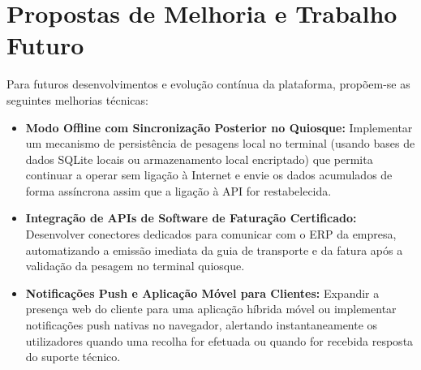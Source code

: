 \section{Propostas de Melhoria e Trabalho Futuro}

Para futuros desenvolvimentos e evolução contínua da plataforma, propõem-se as seguintes melhorias técnicas:
\begin{itemize}
    \item \textbf{Modo Offline com Sincronização Posterior no Quiosque:} Implementar um mecanismo de persistência de pesagens local no terminal (usando bases de dados SQLite locais ou armazenamento local encriptado) que permita continuar a operar sem ligação à Internet e envie os dados acumulados de forma assíncrona assim que a ligação à API for restabelecida.
    \item \textbf{Integração de APIs de Software de Faturação Certificado:} Desenvolver conectores dedicados para comunicar com o ERP da empresa, automatizando a emissão imediata da guia de transporte e da fatura após a validação da pesagem no terminal quiosque.
    \item \textbf{Notificações Push e Aplicação Móvel para Clientes:} Expandir a presença web do cliente para uma aplicação híbrida móvel ou implementar notificações push nativas no navegador, alertando instantaneamente os utilizadores quando uma recolha for efetuada ou quando for recebida resposta do suporte técnico.
\end{itemize}